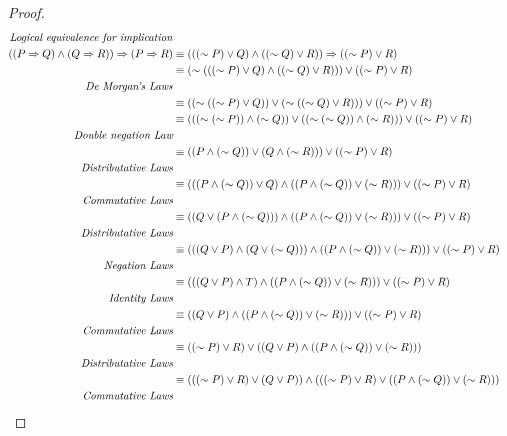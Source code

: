 \documentclass[12pt]{article}
\newenvironment{problem}[2][Problem]{\begin{trivlist}
		\item[\hskip \labelsep {\bfseries #1}\hskip \labelsep {\bfseries #2.}]}{\end{trivlist}}
\newenvironment{solution}[2][Solution]{\begin{trivlist}
		\item[\hskip \labelsep {\bfseries #1}\hskip \labelsep {\bfseries #2.}]}{\end{trivlist}}
\begin{document}
\begin{problem}{49}
\begin{solution}{}
\begin{proof}
	\begin{align*}
		\text{\emph{Logical equivalence for implication}}\\
		((P\Rightarrow Q)\wedge (Q \Rightarrow R))\Rightarrow (P \Rightarrow R) &\equiv (((\sim P) \vee Q)\wedge ((\sim Q)\vee R)) \Rightarrow ((\sim P) \vee R)\\
		&\equiv (\sim (((\sim P) \vee Q)\wedge ((\sim Q)\vee R))) \vee ((\sim P) \vee R)\\
		\text{\emph{De Morgan's Laws}}\\
		&\equiv ((\sim((\sim P) \vee Q)) \vee (\sim((\sim Q) \vee R))) \vee ((\sim P) \vee R)\\
		&\equiv (((\sim(\sim P)) \wedge (\sim Q)) \vee ((\sim(\sim Q)) \wedge (\sim R))) \vee ((\sim P)\vee R)\\
		\textit{Double negation Law}\\
		&\equiv ((P \wedge (\sim Q)) \vee (Q \wedge (\sim R))) \vee ((\sim P)\vee R)\\
		\textit{Distributative Laws}\\
		&\equiv (((P \wedge (\sim Q))\vee Q)\wedge ((P \wedge (\sim Q))\vee (\sim R))) \vee ((\sim P)\vee R)\\
		\textit{Commutative Laws}\\
		&\equiv ((Q \vee (P \wedge (\sim Q))) \wedge ((P \wedge (\sim Q)) \vee (\sim R) )) \vee ((\sim P)\vee R)\\
		\textit{Distributative Laws}\\
		&\equiv (((Q\vee P) \wedge (Q \vee (\sim Q))) \wedge ((P \wedge (\sim Q)) \vee (\sim R) )) \vee ((\sim P)\vee R)\\
		\textit{Negation Laws}\\
			&\equiv (((Q\vee P) \wedge T) \wedge ((P \wedge (\sim Q)) \vee (\sim R) )) \vee ((\sim P)\vee R)\\
		\textit{Identity Laws}\\
			&\equiv ((Q\vee P) \wedge ((P \wedge (\sim Q)) \vee (\sim R) )) \vee ((\sim P)\vee R)\\
		\textit{Commutative Laws}\\
			& \equiv ((\sim P)\vee R) \vee ((Q\vee P) \wedge ((P \wedge (\sim Q)) \vee (\sim R) ))\\
		\textit{Distributative Laws}\\
			& \equiv (((\sim P)\vee R) \vee (Q\vee P)) \wedge (((\sim P)\vee R) \vee((P \wedge (\sim Q)) \vee (\sim R)) )\\
		\textit{Commutative Laws}\\

\end{align*}
\end{proof}
\end{solution}
\end{problem}
\end{document}
